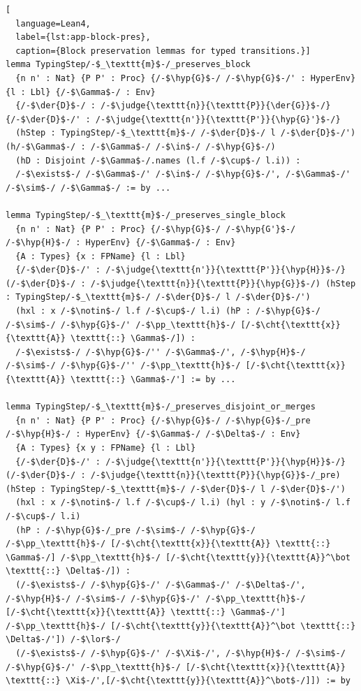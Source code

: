 \begin{lstlisting}[
  language=Lean4,
  label={lst:app-block-pres},
  caption={Block preservation lemmas for typed transitions.}]
lemma TypingStep/-$_\texttt{m}$-/_preserves_block
  {n n' : Nat} {P P' : Proc} {/-$\hyp{G}$-/ /-$\hyp{G}$-/' : HyperEnv} {l : Lbl} {/-$\Gamma$-/ : Env}
  {/-$\der{D}$-/ : /-$\judge{\texttt{n}}{\texttt{P}}{\der{G}}$-/} {/-$\der{D}$-/' : /-$\judge{\texttt{n'}}{\texttt{P'}}{\hyp{G}'}$-/}
  (hStep : TypingStep/-$_\texttt{m}$-/ /-$\der{D}$-/ l /-$\der{D}$-/') (h/-$\Gamma$-/ : /-$\Gamma$-/ /-$\in$-/ /-$\hyp{G}$-/)
  (hD : Disjoint /-$\Gamma$-/.names (l.f /-$\cup$-/ l.i)) :
  /-$\exists$-/ /-$\Gamma$-/' /-$\in$-/ /-$\hyp{G}$-/', /-$\Gamma$-/' /-$\sim$-/ /-$\Gamma$-/ := by ...

lemma TypingStep/-$_\texttt{m}$-/_preserves_single_block 
  {n n' : Nat} {P P' : Proc} {/-$\hyp{G}$-/ /-$\hyp{G'}$-/ /-$\hyp{H}$-/ : HyperEnv} {/-$\Gamma$-/ : Env}
  {A : Types} {x : FPName} {l : Lbl}
  {/-$\der{D}$-/' : /-$\judge{\texttt{n'}}{\texttt{P'}}{\hyp{H}}$-/} (/-$\der{D}$-/ : /-$\judge{\texttt{n}}{\texttt{P}}{\hyp{G}}$-/) (hStep : TypingStep/-$_\texttt{m}$-/ /-$\der{D}$-/ l /-$\der{D}$-/')
  (hxl : x /-$\notin$-/ l.f /-$\cup$-/ l.i) (hP : /-$\hyp{G}$-/ /-$\sim$-/ /-$\hyp{G}$-/' /-$\pp_\texttt{h}$-/ [/-$\cht{\texttt{x}}{\texttt{A}} \texttt{::} \Gamma$-/]) :
  /-$\exists$-/ /-$\hyp{G}$-/'' /-$\Gamma$-/', /-$\hyp{H}$-/ /-$\sim$-/ /-$\hyp{G}$-/'' /-$\pp_\texttt{h}$-/ [/-$\cht{\texttt{x}}{\texttt{A}} \texttt{::} \Gamma$-/'] := by ...

lemma TypingStep/-$_\texttt{m}$-/_preserves_disjoint_or_merges 
  {n n' : Nat} {P P' : Proc} {/-$\hyp{G}$-/ /-$\hyp{G}$-/_pre /-$\hyp{H}$-/ : HyperEnv} {/-$\Gamma$-/ /-$\Delta$-/ : Env}
  {A : Types} {x y : FPName} {l : Lbl}
  {/-$\der{D}$-/' : /-$\judge{\texttt{n'}}{\texttt{P'}}{\hyp{H}}$-/} (/-$\der{D}$-/ : /-$\judge{\texttt{n}}{\texttt{P}}{\hyp{G}}$-/_pre) (hStep : TypingStep/-$_\texttt{m}$-/ /-$\der{D}$-/ l /-$\der{D}$-/')
  (hxl : x /-$\notin$-/ l.f /-$\cup$-/ l.i) (hyl : y /-$\notin$-/ l.f /-$\cup$-/ l.i)
  (hP : /-$\hyp{G}$-/_pre /-$\sim$-/ /-$\hyp{G}$-/ /-$\pp_\texttt{h}$-/ [/-$\cht{\texttt{x}}{\texttt{A}} \texttt{::} \Gamma$-/] /-$\pp_\texttt{h}$-/ [/-$\cht{\texttt{y}}{\texttt{A}}^\bot \texttt{::} \Delta$-/]) :
  (/-$\exists$-/ /-$\hyp{G}$-/' /-$\Gamma$-/' /-$\Delta$-/', /-$\hyp{H}$-/ /-$\sim$-/ /-$\hyp{G}$-/' /-$\pp_\texttt{h}$-/ [/-$\cht{\texttt{x}}{\texttt{A}} \texttt{::} \Gamma$-/'] /-$\pp_\texttt{h}$-/ [/-$\cht{\texttt{y}}{\texttt{A}}^\bot \texttt{::} \Delta$-/']) /-$\lor$-/
  (/-$\exists$-/ /-$\hyp{G}$-/' /-$\Xi$-/', /-$\hyp{H}$-/ /-$\sim$-/ /-$\hyp{G}$-/' /-$\pp_\texttt{h}$-/ [/-$\cht{\texttt{x}}{\texttt{A}} \texttt{::} \Xi$-/',[/-$\cht{\texttt{y}}{\texttt{A}}^\bot$-/]]) := by
\end{lstlisting}

